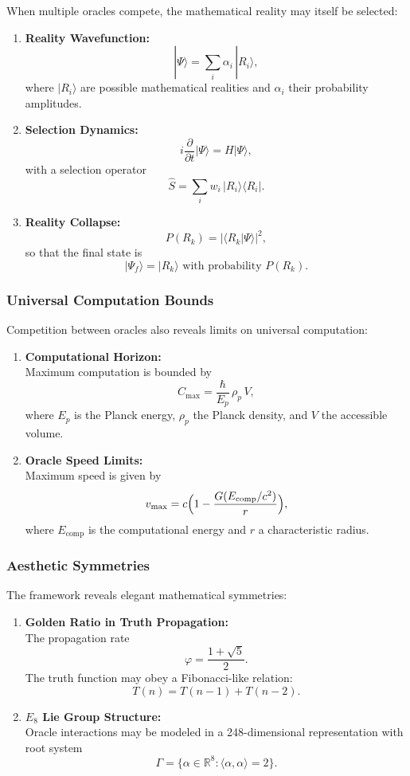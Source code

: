 \documentclass[11pt]{article}
\begin{document}
When multiple oracles compete, the mathematical reality may itself be selected:
\begin{enumerate}[label=(\arabic*)]
    \item \textbf{Reality Wavefunction:} 
    \[
    |\Psi\rangle = \sum_i \alpha_i\,|R_i\rangle,
    \]
    where $|R_i\rangle$ are possible mathematical realities and $\alpha_i$ their probability amplitudes.
    \item \textbf{Selection Dynamics:} 
    \[
    i\frac{\partial}{\partial t}|\Psi\rangle = H|\Psi\rangle,
    \]
    with a selection operator
    \[
    \hat{S}=\sum_i w_i\,|R_i\rangle\langle R_i|.
    \]
    \item \textbf{Reality Collapse:} 
    \[
    P(R_k)=|\langle R_k|\Psi\rangle|^2,
    \]
    so that the final state is
    \[
    |\Psi_f\rangle = |R_k\rangle \text{ with probability } P(R_k).
    \]
\end{enumerate}

\subsubsection{Universal Computation Bounds}

Competition between oracles also reveals limits on universal computation:
\begin{enumerate}[label=(\arabic*)]
    \item \textbf{Computational Horizon:} \\
    Maximum computation is bounded by
    \[
    C_{\max}=\frac{\hbar}{E_p}\,\rho_p\,V,
    \]
    where $E_p$ is the Planck energy, $\rho_p$ the Planck density, and $V$ the accessible volume.
    \item \textbf{Oracle Speed Limits:} \\
    Maximum speed is given by
    \[
    v_{\max}=c\Bigl(1-\frac{G(E_{\text{comp}}/c^2)}{r}\Bigr),
    \]
    where $E_{\text{comp}}$ is the computational energy and $r$ a characteristic radius.
\end{enumerate}

\subsubsection{Aesthetic Symmetries}

The framework reveals elegant mathematical symmetries:
\begin{enumerate}[label=(\arabic*)]
    \item \textbf{Golden Ratio in Truth Propagation:} \\
    The propagation rate
    \[
    \varphi = \frac{1+\sqrt{5}}{2}.
    \]
    The truth function may obey a Fibonacci-like relation:
    \[
    T(n)=T(n-1)+T(n-2).
    \]
    \item \textbf{$E_8$ Lie Group Structure:} \\
    Oracle interactions may be modeled in a 248-dimensional representation with root system
    \[
    \Gamma=\{\alpha\in\mathbb{R}^8: \langle\alpha,\alpha\rangle=2\}.
    \]
\end{enumerate}
\end{document}
